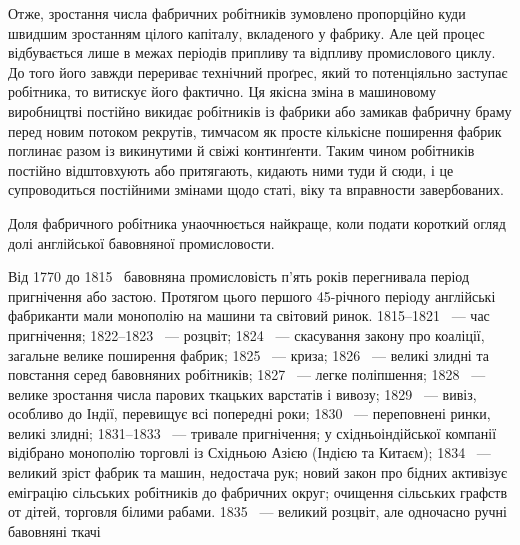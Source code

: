 Отже, зростання числа фабричних робітників зумовлено пропорційно
куди швидшим зростанням цілого капіталу, вкладеного
у фабрику. Але цей процес відбувається лише в межах періодів
припливу та відпливу промислового циклу. До того його завжди
перериває технічний проґрес, який то потенціяльно заступає робітника,
то витискує його фактично. Ця якісна зміна в машиновому
виробництві постійно викидає робітників із фабрики або замикав
фабричну браму перед новим потоком рекрутів, тимчасом як
просте кількісне поширення фабрик поглинає разом із викинутими
й свіжі континґенти. Таким чином робітників постійно відштовхують
або притягають, кидають ними туди й сюди, і це
супроводиться постійними змінами щодо статі, віку та вправности
завербованих.

Доля фабричного робітника унаочнюється найкраще, коли
подати короткий огляд долі англійської бавовняної промисловости.

Від 1770 до 1815~ бавовняна промисловість п’ять років перегнивала
період пригнічення або застою. Протягом цього першого
45-річного періоду англійські фабриканти мали монополію на
машини та світовий ринок. 1815--1821~ — час пригнічення;
1822--1823~ — розцвіт; 1824~ — скасування закону про коаліції,
загальне велике поширення фабрик; 1825~ — криза;
1826~ — великі злидні та повстання серед бавовняних робітників;
1827~ — легке поліпшення; 1828~ — велике зростання
числа парових ткацьких варстатів і вивозу; 1829~ — вивіз,
особливо до Індії, перевищує всі попередні роки; 1830~ —
переповнені ринки, великі злидні; 1831--1833~ — тривале
пригнічення; у східньоіндійської компанії відібрано монополію
торговлі із Східньою Азією (Індією та Китаєм); 1834~ — великий
зріст фабрик та машин, недостача рук; новий закон про бідних
активізує еміграцію сільських робітників до фабричних округ;
очищення сільських графств от дітей, торговля білими рабами.
1835~ — великий розцвіт, але одночасно ручні бавовняні ткачі
\parbreak{}  %
